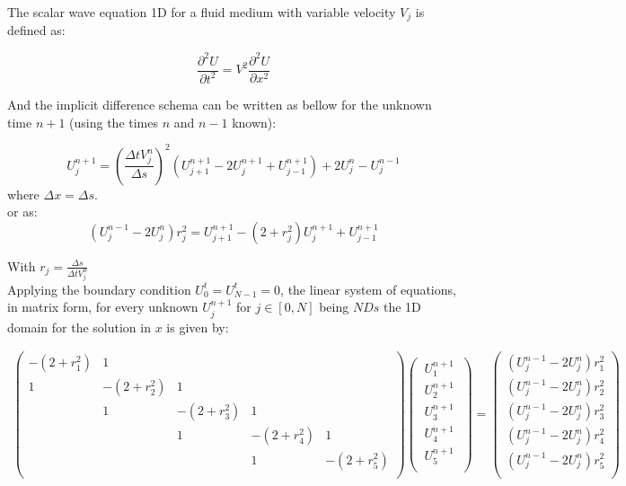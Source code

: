 \documentclass[legalpaper, 12pt]{book}
\begin{document}
The scalar wave equation 1D for a fluid medium with variable velocity $ V_j$ is defined as:

\begin{equation}
\frac{\partial^2 U}{\partial t ^2} = V^2 \frac{\partial^2 U}{\partial x ^2}
\label{1}
\end{equation}

And the implicit difference schema can be written as bellow for the unknown time $n+1$ (using the times $n$ and $n-1$ known):

\begin{equation}
U_j^{n+1}  =  \left(\frac{\Delta t  V_j^n}{\Delta s}\right)^2 \left(  U_{j+1}^{n+1} - 2 U_j^{n+1} + U_{j-1}^{n+1}  \right) + 2 U_j^n - U_j^{n-1}
\label{2} 
\end{equation}
where $\Delta x = \Delta s $. \\
or as:
\begin{equation}
\left(U_j^{n-1} - 2 U_j^n \right) r_j^{2} =   U_{j+1}^{n+1} - (2 + r_j^2) U_j^{n+1} + U_{j-1}^{n+1} 
\end{equation}

With $r_j = \frac{\Delta s}{\Delta t  V_j^n} $ \\

Applying the boundary condition $U_0^t=U_{N-1}^t=0$, the linear system of equations, in matrix form, for every unknown $ U_j^{n+1} $ for $j \in [0, N]$ being $NDs$ the 1D domain for the solution in $x$ is given by:

\begin{eqnarray}
\begin{pmatrix}
-(2+r_1^2)   &      1      &             &            &            \\
      1      & -(2+r_2^2)  &      1      &            &            \\ 
             &      1      & -(2+r_3^2)  &     1      &            \\ 
             &             &      1      & -(2+r_4^2) &    1       \\    
             &             &             &     1      & -(2+r_5^2) \\    
\end{pmatrix} 
\begin{pmatrix}
 \ U_{1}^{n+1} \ \\
 \ U_{2}^{n+1} \ \\ 
 \ U_{3}^{n+1} \ \\ 
 \ U_{4}^{n+1} \ \\ 
 \ U_{5}^{n+1} \ \\ 
\end{pmatrix}
=
\begin{pmatrix}
\left(U_j^{n-1} - 2 U_j^n \right) r_1^{2} \\
\left(U_j^{n-1} - 2 U_j^n \right) r_2^{2} \\ 
\left(U_j^{n-1} - 2 U_j^n \right) r_3^{2} \\ 
\left(U_j^{n-1} - 2 U_j^n \right) r_4^{2} \\ 
\left(U_j^{n-1} - 2 U_j^n \right) r_5^{2} \\ 
\end{pmatrix}
\end{eqnarray}
\end{document}
